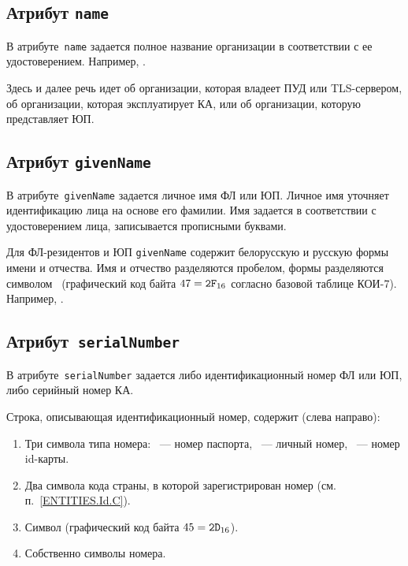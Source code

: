 \subsection{Атрибут \texttt{name}}\label{ENTITIES.Id.N}

В атрибуте~\texttt{name} задается полное название организации
в соответствии с ее удостоверением. Например, .  

Здесь и далее речь идет об организации,
которая владеет ПУД или TLS-сервером, 
об организации, которая эксплуатирует КА,
или об организации, которую представляет ЮП.

\subsection{Атрибут \texttt{givenName}}\label{ENTITIES.Id.GN}

В атрибуте~\texttt{givenName} задается личное имя ФЛ или ЮП.
Личное имя уточняет идентификацию лица на основе его фамилии.
%
Имя задается в соответствии с удостоверением лица, 
записывается прописными буквами. 

Для ФЛ-резидентов и ЮП \texttt{givenName} содержит белорусскую и русскую 
формы имени и отчества. Имя и отчество разделяются пробелом, формы 
разделяются символом~\str{/} (графический код байта $47=\texttt{2F}_{16}$ 
согласно базовой таблице КОИ-7). 
Например, .

\subsection{Атрибут~\texttt{serialNumber}}\label{ENTITIES.Id.SN}

В атрибуте~\texttt{serialNumber} задается либо идентификационный номер ФЛ 
или ЮП, либо серийный номер КА. 

Строка, описывающая идентификационный номер, содержит (слева направо):
\begin{enumerate}
\item
Три символа типа номера:
~--- номер паспорта, 
~--- личный номер, 
~--- номер id-карты.

\item
Два символа кода страны, в которой зарегистрирован номер 
(см. п.~\ref{ENTITIES.Id.C}).
\item
Символ \str{-} (графический код байта $45=\texttt{2D}_{16}$).
\item
Собственно символы номера.
\end{enumerate}

